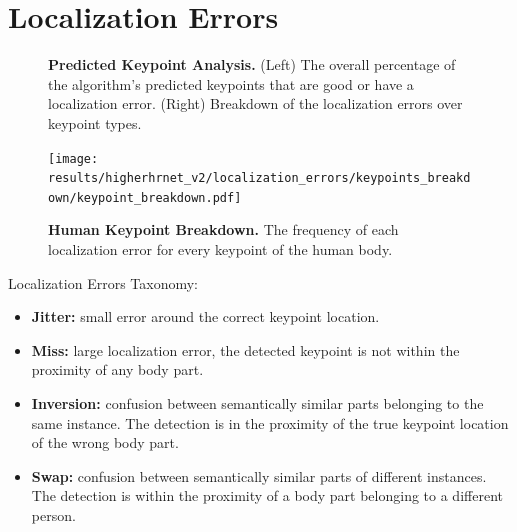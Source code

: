 \documentclass[10pt,onecolumn,letterpaper]{article}
\begin{document}
\clearpage

\section{Localization Errors}

\begin{figure}[h!]
\centering
{}
\caption{ {\small \textbf{Predicted Keypoint Analysis.}
(Left) The overall percentage of the algorithm's predicted keypoints that are good or have a localization error.
(Right) Breakdown of the localization errors over keypoint types.}}
\end{figure}

\begin{figure}
\texttt{[image: results/higherhrnet\_v2/localization\_errors/keypoints\_breakdown/keypoint\_breakdown.pdf]}
\caption{ {\small \textbf{Human Keypoint Breakdown.} The frequency of each localization error for every keypoint of the human body.}}
\end{figure}

Localization Errors Taxonomy:
\begin{itemize}
\item \textbf{Jitter:} small error around the correct keypoint location.

\item \textbf{Miss:} large localization error, the detected keypoint is not within the proximity of any body part.

\item \textbf{Inversion:} confusion between semantically similar parts belonging to the same instance. The detection is in the proximity of the true keypoint location of the wrong body part.

\item \textbf{Swap:} confusion between semantically similar parts of different instances. The detection is within the proximity of a body part belonging to a different person.

\end{itemize}
\end{document}
